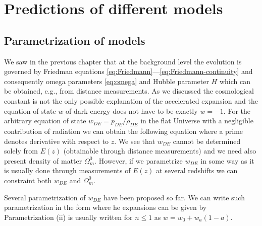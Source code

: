 \section{Predictions of different models}

\subsection{Parametrization of models}
We saw in the previous chapter that at the background level the evolution is governed by Friedman equations \eqref{eq:Friedmann}---\eqref{eq:Friedmann-continuity} and consequently omega parameters \eqref{eq:omega} and Hubble parameter $H$ which can be obtained, e.g., from distance measurements. As we discussed the cosmological constant is not the only possible explanation of the accelerated expansion and the equation of state \(w\) of dark energy does not have to be exactly \(w=-1\). For the arbitrary equation of state $w_{DE}=p_{DE}/\rho_{DE}$ in the flat Universe with a negligible contribution of radiation we can obtain the following equation
where a prime denotes derivative with respect to \(z\). We see that \(w_{DE}\) cannot be determined solely from \(E(z)\) (obtainable through distance measurements) and we need also present density of matter \(\Omega_m^0\). However, if we parametrize \(w_{DE}\) in some way as it is usually done through measurements of \(E(z)\) at several redshifts we can constraint both \(w_{DE}\) and \(\Omega_m^0\).

Several parametrization  of \(w_{DE}\) have been proposed so far. We can write such parametrization  in the form
where he expansions can be given by
Parametrization (ii) is usually written for \(n\leq1\) as \(w=w_0+w_a(1-a)\).